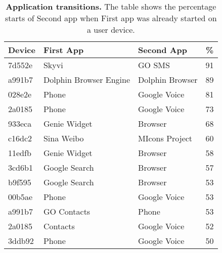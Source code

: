 \begin{table}[t]
{\small
\begin{tabularx}{\columnwidth}{lXXc}
\multicolumn{1}{l}{\normalsize{\textbf{Device}}} &
\multicolumn{1}{l}{\normalsize{\textbf{First App}}} &
\multicolumn{1}{l}{\normalsize{\textbf{Second App}}} &
\multicolumn{1}{c}{\normalsize{\textbf{\%}}} \\
\toprule
7d552e & Skyvi & GO SMS & 91\\ 
a991b7 & Dolphin Browser Engine & Dolphin Browser & 89\\ 
028e2e & Phone & Google Voice & 81\\ 
2a0185 & Phone & Google Voice & 73\\ 
933eca & Genie Widget & Browser & 68\\ 
c16dc2 & Sina Weibo & MIcons Project & 60\\ 
11edfb & Genie Widget & Browser & 58\\ 
3cd6b1 & Google Search & Browser & 57\\ 
b9f595 & Google Search & Browser & 53\\ 
00b5ae & Phone & Google Voice & 53\\ 
a991b7 & GO Contacts & Phone & 53\\ 
2a0185 & Contacts & Google Voice & 52\\ 
3ddb92 & Phone & Google Voice & 50\\ 
\end{tabularx}}
\caption{{\bf Application transitions.} The table shows the percentage starts of
Second app when First app was already started on a user device.}
\label{tab-apptransitions}
\end{table}
